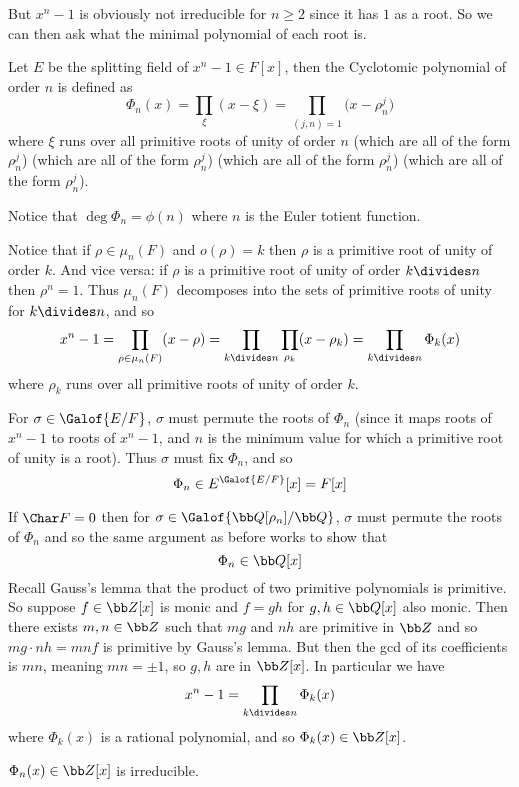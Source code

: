 But $x^n-1$ is obviously not irreducible for $n\geq2$ since it has $1$ as a root.
So we can then ask what the minimal polynomial of each root is.

\bdefn

    Let $E$ be the splitting field of $x^n-1\in F[x]$, then the {\emphcolor Cyclotomic polynomial} of order $n$ is defined as
    $$ \Phi_n(x) = \prod_\xi(x-\xi) = \prod_{(j,n)=1}\bigl(x-\rho_n^j\bigr) $$
    where $\xi$ runs over all primitive roots of unity of order $n$ (which are all of the form $\rho_n^j$) (which are all of the form $\rho_n^j$) (which are all of the form $\rho_n^j$) (which are all of
    the form $\rho_n^j$).

\edefn

Notice that $\deg\Phi_n=\phi(n)$ where $n$ is the Euler totient function.

Notice that if $\rho\in\mu_n(F)$ and $o(\rho)=k$ then $\rho$ is a primitive root of unity of order $k$.
And vice versa: if $\rho$ is a primitive root of unity of order $k\divides n$ then $\rho^n=1$.
Thus $\mu_n(F)$ decomposes into the sets of primitive roots of unity for $k\divides n$, and so
$$ x^n - 1 = \prod_{\rho\in\mu_n(F)}(x-\rho) = \prod_{k\divides n}\prod_{\rho_k}(x-\rho_k) = \prod_{k\divides n}\Phi_k(x) $$
where $\rho_k$ runs over all primitive roots of unity of order $k$.

For $\sigma\in\Galof{E/F}$, $\sigma$ must permute the roots of $\Phi_n$ (since it maps roots of $x^n-1$ to roots of $x^n-1$, and $n$ is the minimum value for which a primitive root of unity is a root).
Thus $\sigma$ must fix $\Phi_n$, and so
$$ \Phi_n \in E^{\Galof{E/F}}[x] = F[x] $$

If $\Char F=0$ then for $\sigma\in\Galof{{\bb Q}[\rho_n]/{\bb Q}}$, $\sigma$ must permute the roots of $\Phi_n$ and so the same argument as before works to show that
$$ \Phi_n \in {\bb Q}[x] $$
Recall Gauss's lemma that the product of two primitive polynomials is primitive.
So suppose $f\in{\bb Z}[x]$ is monic and $f=gh$ for $g,h\in{\bb Q}[x]$ also monic.
Then there exists $m,n\in{\bb Z}$ such that $mg$ and $nh$ are primitive in ${\bb Z}$ and so $mg\cdot nh=mnf$ is primitive by Gauss's lemma.
But then the gcd of its coefficients is $mn$, meaning $mn=\pm1$, so $g,h$ are in ${\bb Z}[x]$.
In particular we have
$$ x^n - 1 = \prod_{k\divides n}\Phi_k(x) $$
where $\Phi_k(x)$ is a rational polynomial, and so $\Phi_k(x)\in{\bb Z}[x]$.

\bthrm

    $\Phi_n(x)\in{\bb Z}[x]$ is irreducible.

